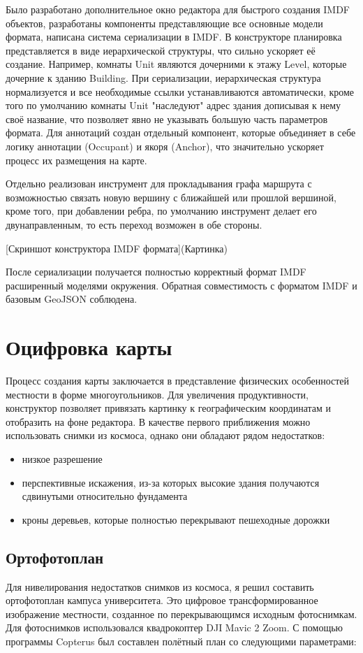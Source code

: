     Было разработано дополнительное окно редактора для быстрого создания IMDF объектов, разработаны компоненты представляющие все основные модели формата, написана система сериализации в IMDF. В конструкторе планировка представляется в виде иерархической структуры, что сильно ускоряет её создание. Например, комнаты Unit являются дочерними к этажу Level, которые дочерние к зданию Building. При сериализации, иерархическая структура нормализуется и все необходимые ссылки устанавливаются автоматически, кроме того по умолчанию комнаты Unit "наследуют" адрес здания дописывая к нему своё название, что позволяет явно не указывать большую часть параметров формата. Для аннотаций создан отдельный компонент, которые объединяет в себе логику аннотации (Occupant) и якоря (Anchor), что значительно ускоряет процесс их размещения на карте.

    Отдельно реализован инструмент для прокладывания графа маршрута с возможностью связать новую вершину с ближайшей или прошлой вершиной, кроме того, при добавлении ребра, по умолчанию инструмент делает его двунаправленным, то есть переход возможен в обе стороны.

    [Скриншот конструктора IMDF формата](Картинка)

    После сериализации получается полностью корректный формат IMDF расширенный моделями окружения. Обратная совместимость с форматом IMDF и базовым GeoJSON соблюдена.

  \section{Оцифровка карты}
    Процесс создания карты заключается в представление физических особенностей местности в форме многоугольников. Для увеличения продуктивности, конструктор позволяет привязать картинку к географическим координатам и отобразить на фоне редактора. В качестве первого приближения можно использовать снимки из космоса, однако они обладают рядом недостатков:
    \begin{itemize}
      \item низкое разрешение
      \item перспективные искажения, из-за которых высокие здания получаются сдвинутыми относительно фундамента
      \item кроны деревьев, которые полностью перекрывают пешеходные дорожки
    \end{itemize}

    \subsection{Ортофотоплан}
      Для нивелирования недостатков снимков из космоса, я решил составить ортофотоплан кампуса университета. Это цифровое трансформированное изображение местности, созданное по перекрывающимся исходным фотоснимкам. Для фотоснимков использовался квадрокоптер DJI Mavic 2 Zoom.
      С помощью программы Copterus \cite{Copterus} был составлен полётный план со следующими параметрами:

